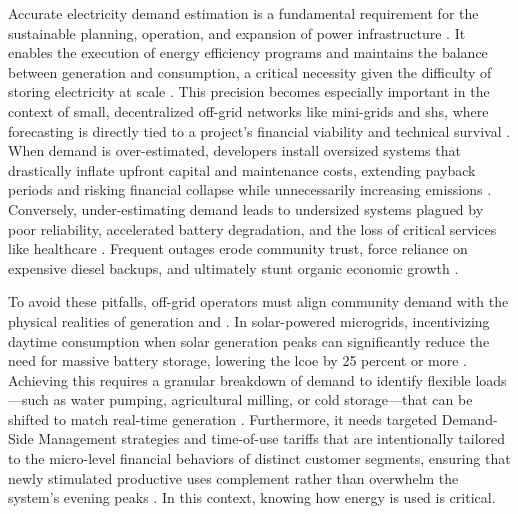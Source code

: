 \documentclass[final,3p,times,onecolumn]{elsarticle}
\begin{document}
Accurate electricity demand estimation is a fundamental requirement for the sustainable planning, operation, and expansion of power infrastructure \cite{adinkrah_artificial_2025, poblete-cazenave_model_2021, guefano_forecast_2021}. It enables the execution of energy efficiency programs and maintains the balance between generation and consumption, a critical necessity given the difficulty of storing electricity at scale \cite{adinkrah_artificial_2025, kavousian_determinants_2013}. This precision becomes especially important in the context of small, decentralized off-grid networks like mini-grids and \gls{shs}, where forecasting is directly tied to a project's financial viability and technical survival \cite{lukuyu_purchasing_2023}. When demand is over-estimated, developers install oversized systems that drastically inflate upfront capital and maintenance costs, extending payback periods and risking financial collapse while unnecessarily increasing emissions \cite{lukuyu_purchasing_2023, blodgett_accuracy_2017, herraiz-canete_forecasting_2022, few_electricity_2022}. Conversely, under-estimating demand leads to undersized systems plagued by poor reliability, accelerated battery degradation, and the loss of critical services like healthcare \cite{lukuyu_purchasing_2023, blodgett_accuracy_2017}. Frequent outages erode community trust, force reliance on expensive diesel backups, and ultimately stunt organic economic growth \cite{herraiz-canete_forecasting_2022, few_electricity_2022}.

To avoid these pitfalls, off-grid operators must align community demand with the physical realities of generation and . In solar-powered microgrids, incentivizing daytime consumption when solar generation peaks can significantly reduce the need for massive battery storage, lowering the \gls{lcoe} by 25 percent or more \cite{lukuyu_purchasing_2023}. Achieving this requires a granular breakdown of demand to identify flexible loads—such as water pumping, agricultural milling, or cold storage—that can be shifted to match real-time generation \cite{kavousian_determinants_2013, few_electricity_2022}. Furthermore, it needs targeted Demand-Side Management strategies and time-of-use tariffs that are intentionally tailored to the micro-level financial behaviors of distinct customer segments, ensuring that newly stimulated productive uses complement rather than overwhelm the system's evening peaks \cite{lukuyu_purchasing_2023, lorenzoni_classification_2020}. In this context, knowing how energy is used is critical.
\end{document}
